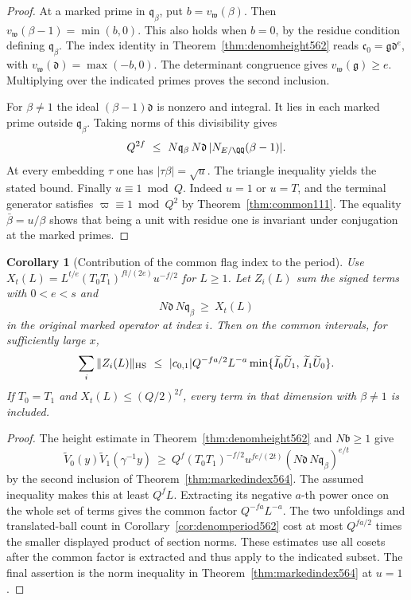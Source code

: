 \documentclass[a4paper,11pt]{article}
\newtheorem{corollary}[proposition]{Corollary}
\theoremstyle{definition}
\theoremstyle{remark}
\numberwithin{equation}{section}
\begin{document}
\begin{proof}
At a marked prime in \(\mathfrak q_\beta\), put
\(b=v_{\mathfrak w}(\beta)\). Then
\(v_{\mathfrak w}(\beta-1)=\min(b,0)\). This also holds when
\(b=0\), by the residue condition defining \(\mathfrak q_\beta\).
The index identity in Theorem~\ref{thm:denomheight562} reads
\(\mathfrak c_0=\mathfrak g\mathfrak d^e\), with
\(v_{\mathfrak w}(\mathfrak d)=\max(-b,0)\). The determinant
congruence gives \(v_{\mathfrak w}(\mathfrak g)\ge e\).
Multiplying over the indicated primes proves the second inclusion.

For \(\beta\ne1\) the ideal \((\beta-1)\mathfrak d\) is nonzero
and integral. It lies in each marked prime outside
\(\mathfrak q_\beta\). Taking norms of this divisibility gives
\[
     Q^{2f}\ \le\ N\mathfrak q_\beta\,N\mathfrak d\,
                                 |N_{E/\QQ}(\beta-1)|.
\]
At every embedding \(\tau\) one has \(|\tau\beta|=\sqrt u\).
The triangle inequality yields the stated bound. Finally
\(u\equiv1\bmod Q\). Indeed \(u=1\) or \(u=T\), and the
terminal generator satisfies \(\varpi\equiv1\bmod Q^2\)
by Theorem~\ref{thm:common111}. The equality
\(\bar\beta=u/\beta\) shows that being a unit with residue one
is invariant under conjugation at the marked primes.
\end{proof}

\begin{corollary}[Contribution of the common flag index to the period]
\leavevmode\label{cor:markedperiod564}
Use \(X_t(L)=L^{t/e}(T_0T_1)^{ft/(2e)}u^{-f/2}\)
for \(L\ge1\). Let \(Z_i(L)\) sum the signed terms with
\(0<e<s\) and
\[
                    N\mathfrak d\,N\mathfrak q_\beta\ \ge\ X_t(L)
\]
in the original marked operator at index \(i\). Then on the
common intervals, for sufficiently large \(x\),
\[
    \sum_i\|Z_i(L)\|_{\rm HS}
       \ \le\ |c_{0,1}|Q^{-fa/2}L^{-a}
         \min\{\widetilde I_0\widetilde U_1,\,
                         \widetilde I_1\widetilde U_0\}.
\]
If \(T_0=T_1\) and \(X_t(L)\le(Q/2)^{2f}\), every term in
that dimension with \(\beta\ne1\) is included.
\end{corollary}
\begin{proof}
The height estimate in Theorem~\ref{thm:denomheight562} and
\(N\mathfrak b\ge1\) give
\[
 \widetilde V_0(y)\widetilde V_1(\gamma^{-1}y)
  \ \ge\ Q^f (T_0T_1)^{-f/2}u^{fe/(2t)}
                    (N\mathfrak d\,N\mathfrak q_\beta)^{e/t}
\]
by the second inclusion of Theorem~\ref{thm:markedindex564}.
The assumed inequality makes this at least \(Q^fL\).
Extracting its negative \(a\)-th power once on the whole set
of terms gives the common factor \(Q^{-fa}L^{-a}\).
The two unfoldings and translated-ball count in
Corollary~\ref{cor:denomperiod562} cost at most \(Q^{fa/2}\)
times the smaller displayed product of section norms. These
estimates use all cosets after the common factor is extracted
and thus apply to the indicated subset. The final assertion
is the norm inequality in Theorem~\ref{thm:markedindex564}
at \(u=1\).
\end{proof}
\end{document}
